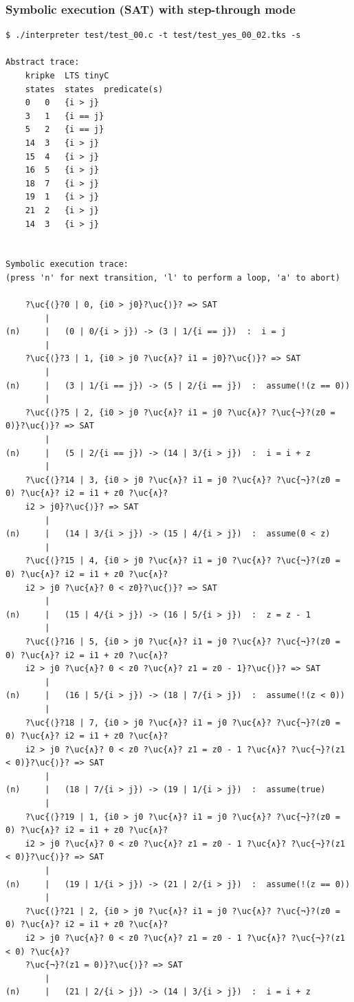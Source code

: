 \documentclass[english,a4paper,oneside]{article}%
\newcommand{\uc}[1]{ \scriptsize{\texttt{#1}} }
\begin{document}
\subsubsection{Symbolic execution (SAT) with step-through mode}
\begin{scriptsize}
\begin{lstlisting}
$ ./interpreter test/test_00.c -t test/test_yes_00_02.tks -s

Abstract trace:
	kripke	LTS	tinyC
	states	states	predicate(s)
	0	0	{i > j}
	3	1	{i == j}
	5	2	{i == j}
	14	3	{i > j}
	15	4	{i > j}
	16	5	{i > j}
	18	7	{i > j}
	19	1	{i > j}
	21	2	{i > j}
	14	3	{i > j}
										

Symbolic execution trace:
(press 'n' for next transition, 'l' to perform a loop, 'a' to abort)

	?\uc{⟨}?0 | 0, {i0 > j0}?\uc{⟩}? => SAT
		|
(n)		|	(0 | 0/{i > j}) -> (3 | 1/{i == j})  :  i = j
		|
	?\uc{⟨}?3 | 1, {i0 > j0 ?\uc{∧}? i1 = j0}?\uc{⟩}? => SAT
		|
(n)		|	(3 | 1/{i == j}) -> (5 | 2/{i == j})  :  assume(!(z == 0))
		|
	?\uc{⟨}?5 | 2, {i0 > j0 ?\uc{∧}? i1 = j0 ?\uc{∧}? ?\uc{¬}?(z0 = 0)}?\uc{⟩}? => SAT
		|
(n)		|	(5 | 2/{i == j}) -> (14 | 3/{i > j})  :  i = i + z
		|
	?\uc{⟨}?14 | 3, {i0 > j0 ?\uc{∧}? i1 = j0 ?\uc{∧}? ?\uc{¬}?(z0 = 0) ?\uc{∧}? i2 = i1 + z0 ?\uc{∧}? 
	i2 > j0}?\uc{⟩}? => SAT
		|
(n)		|	(14 | 3/{i > j}) -> (15 | 4/{i > j})  :  assume(0 < z)
		|
	?\uc{⟨}?15 | 4, {i0 > j0 ?\uc{∧}? i1 = j0 ?\uc{∧}? ?\uc{¬}?(z0 = 0) ?\uc{∧}? i2 = i1 + z0 ?\uc{∧}? 
	i2 > j0 ?\uc{∧}? 0 < z0}?\uc{⟩}? => SAT
		|
(n)		|	(15 | 4/{i > j}) -> (16 | 5/{i > j})  :  z = z - 1
		|
	?\uc{⟨}?16 | 5, {i0 > j0 ?\uc{∧}? i1 = j0 ?\uc{∧}? ?\uc{¬}?(z0 = 0) ?\uc{∧}? i2 = i1 + z0 ?\uc{∧}? 
	i2 > j0 ?\uc{∧}? 0 < z0 ?\uc{∧}? z1 = z0 - 1}?\uc{⟩}? => SAT
		|
(n)		|	(16 | 5/{i > j}) -> (18 | 7/{i > j})  :  assume(!(z < 0))
		|
	?\uc{⟨}?18 | 7, {i0 > j0 ?\uc{∧}? i1 = j0 ?\uc{∧}? ?\uc{¬}?(z0 = 0) ?\uc{∧}? i2 = i1 + z0 ?\uc{∧}? 
	i2 > j0 ?\uc{∧}? 0 < z0 ?\uc{∧}? z1 = z0 - 1 ?\uc{∧}? ?\uc{¬}?(z1 < 0)}?\uc{⟩}? => SAT
		|
(n)		|	(18 | 7/{i > j}) -> (19 | 1/{i > j})  :  assume(true)
		|
	?\uc{⟨}?19 | 1, {i0 > j0 ?\uc{∧}? i1 = j0 ?\uc{∧}? ?\uc{¬}?(z0 = 0) ?\uc{∧}? i2 = i1 + z0 ?\uc{∧}? 
	i2 > j0 ?\uc{∧}? 0 < z0 ?\uc{∧}? z1 = z0 - 1 ?\uc{∧}? ?\uc{¬}?(z1 < 0)}?\uc{⟩}? => SAT
		|
(n)		|	(19 | 1/{i > j}) -> (21 | 2/{i > j})  :  assume(!(z == 0))
		|
	?\uc{⟨}?21 | 2, {i0 > j0 ?\uc{∧}? i1 = j0 ?\uc{∧}? ?\uc{¬}?(z0 = 0) ?\uc{∧}? i2 = i1 + z0 ?\uc{∧}? 
	i2 > j0 ?\uc{∧}? 0 < z0 ?\uc{∧}? z1 = z0 - 1 ?\uc{∧}? ?\uc{¬}?(z1 < 0) ?\uc{∧}? 
	?\uc{¬}?(z1 = 0)}?\uc{⟩}? => SAT
		|
(n)		|	(21 | 2/{i > j}) -> (14 | 3/{i > j})  :  i = i + z

\end{lstlisting}
\end{scriptsize}
\end{document}
